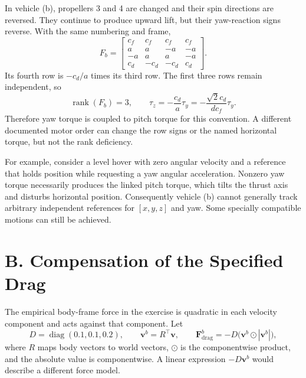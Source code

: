 In vehicle (b), propellers 3 and 4 are changed and their spin directions are
reversed. They continue to produce upward lift, but their yaw-reaction signs
reverse. With the same numbering and frame,
\begin{equation}
F_b=\begin{bmatrix}
c_f&c_f&c_f&c_f\\
a&a&-a&-a\\
-a&a&a&-a\\
c_d&-c_d&-c_d&c_d
\end{bmatrix}.
\end{equation}
Its fourth row is $-c_d/a$ times its third row. The first three rows remain
independent, so
\begin{equation}
\boxed{\operatorname{rank}(F_b)=3,\qquad
\tau_z=-\frac{c_d}{a}\tau_y=-\frac{\sqrt2c_d}{dc_f}\tau_y.}
\end{equation}
Therefore yaw torque is coupled to pitch torque for this convention. A different
documented motor order can change the row signs or the named horizontal torque,
but not the rank deficiency.

For example, consider a level hover with zero angular velocity and a reference
that holds position while requesting a yaw angular acceleration. Nonzero yaw
torque necessarily produces the linked pitch torque, which tilts the thrust
axis and disturbs horizontal position. Consequently vehicle (b) cannot generally
track arbitrary independent references for $[x,y,z]$ and yaw. Some specially
compatible motions can still be achieved.

\clearpage
\section{B. Compensation of the Specified Drag}
The empirical body-frame force in the exercise is quadratic in each velocity
component and acts against that component. Let
\begin{equation}
D=\operatorname{diag}(0.1,0.1,0.2),\qquad
\mathbf v^b=R^\top\mathbf v,\qquad
\mathbf F^b_{\mathrm{drag}}=-D\bigl(\mathbf v^b\odot|\mathbf v^b|\bigr),
\end{equation}
where $R$ maps body vectors to world vectors, $\odot$ is the componentwise
product, and the absolute value is componentwise. A linear expression
$-D\mathbf v^b$ would describe a different force model.

